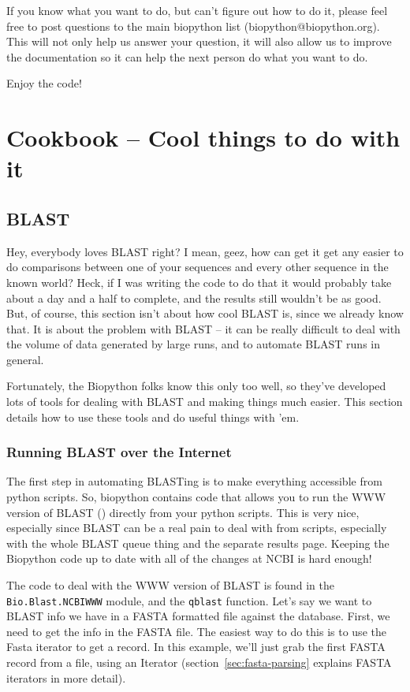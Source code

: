 \documentclass{report}
\begin{document}
If you know what you want to do, but can't figure out how to do it, please feel free to post questions to the main biopython list (biopython@biopython.org). This will not only help us answer your question, it will also allow us to improve the documentation so it can help the next person do what you want to do.


Enjoy the code!

\chapter{Cookbook -- Cool things to do with it}
\label{sec:cookbook}

\section{BLAST}

Hey, everybody loves BLAST right? I mean, geez, how can get it get any easier to do comparisons between one of your sequences and every other sequence in the known world? Heck, if I was writing the code to do that it would probably take about a day and a half to complete, and the results still wouldn't be as good. But, of course, this section isn't about how cool BLAST is, since we already know that. It is about the problem with BLAST -- it can be really difficult to deal with the volume of data generated by large runs, and to automate BLAST runs in general.


Fortunately, the Biopython folks know this only too well, so they've developed lots of tools for dealing with BLAST and making things much easier. This section details how to use these tools and do useful things with 'em. 

\subsection{Running BLAST over the Internet}
\label{sec:running-www-blast}

The first step in automating BLASTing is to make everything accessible
from python scripts. So, biopython contains code that allows you to
run the WWW version of BLAST
() directly from
your python scripts. This is very nice, especially since BLAST can be
a real pain to deal with from scripts, especially with the whole BLAST
queue thing and the separate results page. Keeping the Biopython code
up to date with all of the changes at NCBI is hard enough!


The code to deal with the WWW version of BLAST is found in the
\verb|Bio.Blast.NCBIWWW| module, and the \verb|qblast| function. Let's
say we want to BLAST info we have in a FASTA formatted file against
the database. First, we need to get the info in the FASTA file. The
easiest way to do this is to use the Fasta iterator to get a
record. In this example, we'll just grab the first FASTA record from a 
file, using an Iterator (section~\ref{sec:fasta-parsing} explains
FASTA iterators in more detail).
\end{document}
